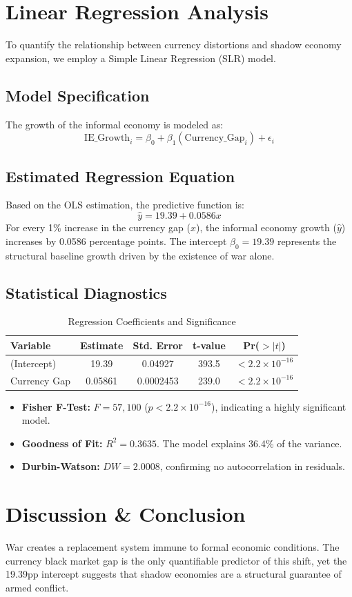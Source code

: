 \documentclass[11pt, a4paper]{article}
\begin{document}
\section{Linear Regression Analysis}
To quantify the relationship between currency distortions and shadow economy expansion, we employ a Simple Linear Regression (SLR) model.

\subsection{Model Specification}
The growth of the informal economy is modeled as:
\begin{equation}
    \text{IE\_Growth}_i = \beta_0 + \beta_1 (\text{Currency\_Gap}_i) + \epsilon_i
\end{equation}

\subsection{Estimated Regression Equation}
Based on the OLS estimation, the predictive function is:
\begin{equation}
    \hat{y} = 19.39 + 0.0586x
\end{equation}
For every 1\% increase in the currency gap ($x$), the informal economy growth ($\hat{y}$) increases by 0.0586 percentage points. The intercept $\beta_0 = 19.39$ represents the structural baseline growth driven by the existence of war alone.

\subsection{Statistical Diagnostics}
\begin{table}[ht]
\centering
\caption{Regression Coefficients and Significance}
\begin{tabular}{lcccc}
\toprule
\textbf{Variable} & \textbf{Estimate} & \textbf{Std. Error} & \textbf{t-value} & \textbf{Pr($>|t|$)} \\
\midrule
(Intercept) & 19.39 & 0.04927 & 393.5 & $< 2.2 \times 10^{-16}$ \\
Currency Gap & 0.05861 & 0.0002453 & 239.0 & $< 2.2 \times 10^{-16}$ \\
\bottomrule
\end{tabular}
\end{table}

\begin{itemize}
    \item \textbf{Fisher F-Test:} $F = 57,100$ ($p < 2.2 \times 10^{-16}$), indicating a highly significant model.
    \item \textbf{Goodness of Fit:} $R^2 = 0.3635$. The model explains 36.4\% of the variance.
    \item \textbf{Durbin-Watson:} $DW = 2.0008$, confirming no autocorrelation in residuals.
\end{itemize}

\section{Discussion \& Conclusion}
War creates a replacement system immune to formal economic conditions. The currency black market gap is the only quantifiable predictor of this shift, yet the 19.39pp intercept suggests that shadow economies are a structural guarantee of armed conflict.
\end{document}
